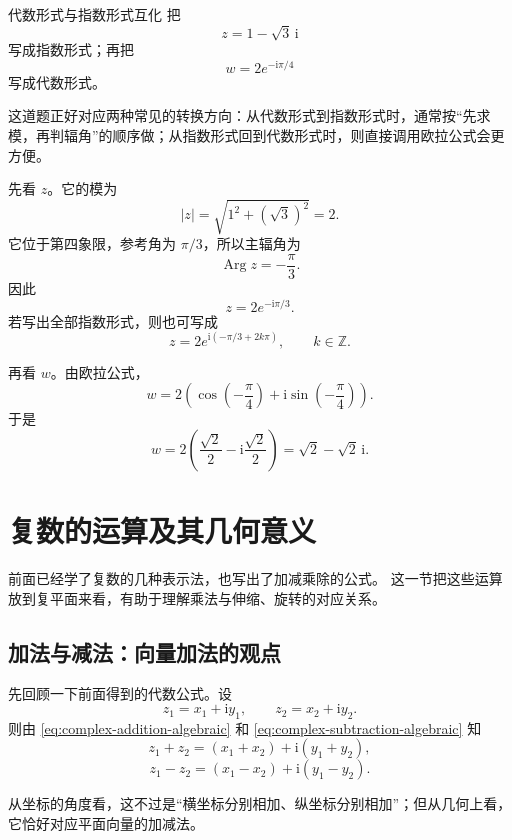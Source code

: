 \begin{lizi}{代数形式与指数形式互化}{}
	把
	\[
	z=1-\sqrt{3}\,\mathrm{i}
	\]
	写成指数形式；再把
	\[
	w=2e^{-\mathrm{i}\pi/4}
	\]
	写成代数形式。
	
	\begin{jie}
		这道题正好对应两种常见的转换方向：从代数形式到指数形式时，通常按``先求模，再判辐角''的顺序做；从指数形式回到代数形式时，则直接调用欧拉公式会更方便。
		
		先看 $z$。它的模为
		\[
		|z|=\sqrt{1^2+(\sqrt{3})^2}=2.
		\]
		它位于第四象限，参考角为 $\pi/3$，所以主辐角为
		\[
		\operatorname{Arg}z=-\frac{\pi}{3}.
		\]
		因此
		\[
		z=2e^{-\mathrm{i}\pi/3}.
		\]
		若写出全部指数形式，则也可写成
		\[
		z=2e^{\mathrm{i}(-\pi/3+2k\pi)},\qquad k\in\mathbb{Z}.
		\]
		
		再看 $w$。由欧拉公式，
		\[
		w=2\left(\cos\left(-\frac{\pi}{4}\right)+\mathrm{i}\sin\left(-\frac{\pi}{4}\right)\right).
		\]
		于是
		\[
		w=2\left(\frac{\sqrt{2}}{2}-\mathrm{i}\frac{\sqrt{2}}{2}\right)=\sqrt{2}-\sqrt{2}\,\mathrm{i}.
		\]
	\end{jie}
\end{lizi}

\section{复数的运算及其几何意义}

\begin{wulibj}[本节的核心观念]
前面已经学了复数的几种表示法，也写出了加减乘除的公式。
这一节把这些运算放到复平面来看，有助于理解乘法与伸缩、旋转的对应关系。
\end{wulibj}

\subsection{加法与减法：向量加法的观点}

先回顾一下前面得到的代数公式。设
\[
z_1=x_1+\mathrm{i}y_1,\qquad z_2=x_2+\mathrm{i}y_2.
\]
则由 \eqref{eq:complex-addition-algebraic} 和 \eqref{eq:complex-subtraction-algebraic} 知
\begin{equation}
    z_1+z_2=(x_1+x_2)+\mathrm{i}(y_1+y_2),
\end{equation}
\begin{equation}
    z_1-z_2=(x_1-x_2)+\mathrm{i}(y_1-y_2).
\end{equation}

从坐标的角度看，这不过是``横坐标分别相加、纵坐标分别相加''；但从几何上看，它恰好对应平面向量的加减法。

